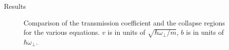 \documentclass[final]{beamer}
\newlength{\colwidth}
\begin{document}
\begin{frame}[t]
\begin{columns}[t]
\begin{column}{\colwidth}
\begin{block}{Results}
\begin{figure}
          \caption{Comparison of the transmission coefficient and the collapse regions for the various equations. $v$ is in units of $\sqrt{\hbar \omega_\perp / m}$, $b$ is in units of $\hbar \omega_\perp$.}
          \label{fig:heatmap}
        \end{figure}
        \begin{figure}
        \end{figure}
      \end{block}


\end{column}
\end{columns}
\end{frame}
\end{document}
